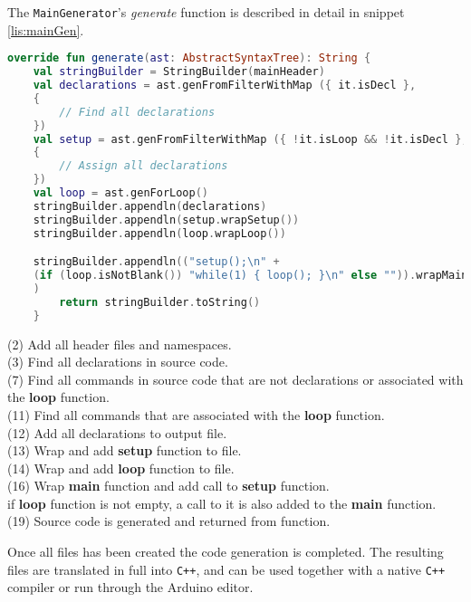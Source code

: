 The \texttt{MainGenerator}'s \textit{generate} function is described in detail in snippet \ref{lis:mainGen}.
\begin{lstlisting}[language=Kotlin,label=lis:mainGen,caption=The implementation of \textit{generate} in \texttt{MainGenerator}.]
override fun generate(ast: AbstractSyntaxTree): String {
	val stringBuilder = StringBuilder(mainHeader)
	val declarations = ast.genFromFilterWithMap ({ it.isDecl }, 
	{
		// Find all declarations	
	})
	val setup = ast.genFromFilterWithMap ({ !it.isLoop && !it.isDecl }, 
	{
	    // Assign all declarations
	})
	val loop = ast.genForLoop()
	stringBuilder.appendln(declarations)
	stringBuilder.appendln(setup.wrapSetup())
	stringBuilder.appendln(loop.wrapLoop())

	stringBuilder.appendln(("setup();\n" +
	(if (loop.isNotBlank()) "while(1) { loop(); }\n" else "")).wrapMain()
	)
		return stringBuilder.toString()
	}
\end{lstlisting}
(2) Add all header files and namespaces.\\ 
(3) Find all declarations in source code.\\
(7) Find all commands in source code that are not declarations or associated with the \textbf{loop} function.\\
(11) Find all commands that are associated with the \textbf{loop} function.\\
(12) Add all declarations to output file.\\
(13) Wrap and add \textbf{setup} function to file.\\
(14) Wrap and add \textbf{loop} function to file.\\
(16) Wrap \textbf{main} function and add call to \textbf{setup} function.\\
if \textbf{loop} function is not empty, a call to it is also added to the \textbf{main} function.\\
(19) Source code is generated and returned from function. 

Once all files has been created the code generation is completed.
The resulting files are translated in full into \texttt{C++}, and can be used together with a native \texttt{C++} compiler or run through the Arduino editor.

